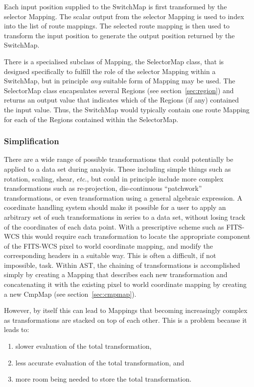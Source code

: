 \documentclass[final,authoryear,5p,times,twocolumn]{elsarticle}
\begin{document}
Each input position supplied to the SwitchMap is first transformed by the
selector Mapping. The scalar output from the selector Mapping is used to
index into the list of route mappings. The selected route mapping is then
used to transform the input position to generate the output position
returned by the SwitchMap.

There is a specialised subclass of Mapping, the SelectorMap class, that
is designed specifically to fulfill the role of the selector Mapping
within a SwitchMap, but in principle \emph{any} suitable form of Mapping
may be used. The SelectorMap class encapsulates several Regions (see
section~\ref{sec:region}) and returns an output value that indicates
which of the  Regions (if any) contained the input value. Thus, the
SwitchMap would typically contain one route Mapping for each of the
Regions contained within the SelectorMap.

\subsubsection{Simplification}
\label{sec:simplification}

There are a wide range of possible transformations that could
potentially be applied to a data set during analysis. These
including simple things such as rotation, scaling, shear, \emph{etc}., but
could in principle include more complex transformations such as
re-projection, dis-continuous ``patchwork'' transformations, or even
transformation using a general algebraic expression.  A coordinate
handling system should make it possible for a user to apply an
arbitrary set of such transformations in series to a data set, without
losing track of the coordinates of each data point. With a
prescriptive scheme such as FITS-WCS this would require each
transformation to locate the appropriate component of the FITS-WCS
pixel to world coordinate mapping, and modify the corresponding
headers in a suitable way. This is often a difficult, if not
impossible, task. Within AST, the chaining of transformations is
accomplished simply by creating a Mapping that describes each new
transformation and concatenating it with the existing pixel to world
coordinate mapping by creating a new CmpMap (see section~\ref{sec:cmpmap}).

However, by itself this can lead to Mappings that becoming increasingly
complex as transformations are stacked on top of each other. This is
a problem because it leads to:

\begin{enumerate}
\item slower evaluation of the total transformation,
\item less accurate evaluation of the total transformation, and
\item more room being needed to store the total transformation.
\end{enumerate}
\end{document}
